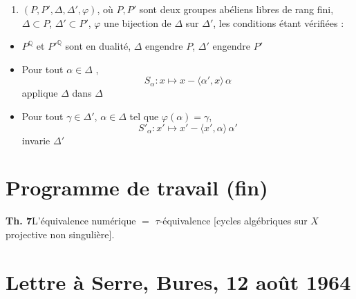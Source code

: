 \documentclass[11pt,a4paper]{article}
\begin{document}
\begin{enumerate}
\item[2.] $(P, P', \Delta, \Delta', \varphi)$, où \struck{\ill{}} $P, P'$ sont deux
groupes abéliens libres de rang fini, \struck{\ill{}} $\Delta \subset P$,
$\Delta' \subset P'$, $\varphi$ une bijection de $\Delta$ sur $\Delta'$,
\struck{\ill{}} les conditions  étant vérifiées :
\end{enumerate}

\begin{itemize}
\item[a)] $P^{\mathbb{Q}}$ et $P'^{\mathbb{Q}}$ sont en dualité, $\Delta$
engendre $P$, $\Delta'$ engendre $P'$ 
\item[b)] Pour tout $\alpha \in \Delta$ ,
\[
  S_{\alpha} : x \longmapsto x - \langle \alpha', x\rangle\, \alpha
\]
applique $\Delta$ dans $\Delta$
\item[b')] Pour tout $\gamma \in \Delta'$, $\alpha \in \Delta$ tel que
$\varphi(\alpha) = \gamma$,
\[
  S'_{\alpha} : x' \longmapsto x' - \langle x', \alpha\rangle\, \alpha'
\]
invarie $\Delta'$
\end{itemize}


\section*{Programme de travail (fin)}




\textbf{Th. 7}\quad L'équivalence numérique $=$ $\tau$-équivalence [cycles
algébriques sur $X$ projective non singulière].

\section*{Lettre à Serre, Bures, 12 août 1964}

\end{document}
